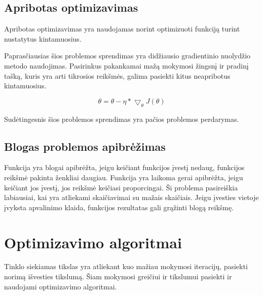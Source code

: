 \documentclass{VUMIFInfKursinis}
\begin{document}
\subsection{Apribotas optimizavimas}
Apribotas optimizavimas yra naudojamas norint optimizuoti funkciją
turint nustatytus kintamuosius.\cite{salt7}
\par
Paprasčiausias šios problemos sprendimas yra didžiausio gradientinio nuolydžio
metodo naudojimas. Pasirinkus pakankamai mažą mokymosi žingsnį ir pradinį tašką, kuris
yra arti tikrosios reikšmės, galima pasiekti kitus neapribotus kintamuosius.

\[
\theta = \theta - \eta * \bigtriangledown_{\theta}J(\theta)
\]

\par
Sudėtingesnis šios problemos sprendimas yra pačios problemos perdarymas. \cite{salt7}

\subsection{Blogas problemos apibrėžimas}

Funkcija yra blogai apibrėžta, jeigu keičiant funkcijos įvestį nedaug, funkcijos reikšmė
pakinta ženkliai daugiau. Funkcija yra laikoma gerai apibrėžta, jeigu keičiant jos įvestį,
jos reikšmė keičiasi proporcingai. Ši problema pasireiškia labiausiai, kai yra
atliekami skaičiavimai su mažais skaičiais. Jeigu įvesties vietoje įvyksta apvalinimo
klaida, funkcijos rezultatas gali grąžinti blogą reikšmę. \cite{salt7}









\section{Optimizavimo algoritmai}
\par
Tinklo siekiamas tikslas yra atliekant kuo mažiau mokymosi iteracijų, pasiekti norimą
išvesties tikslumą. Šiam mokymosi greičiui ir tikslumui pasiekti ir naudojami
optimizavimo algoritmai.
\end{document}
